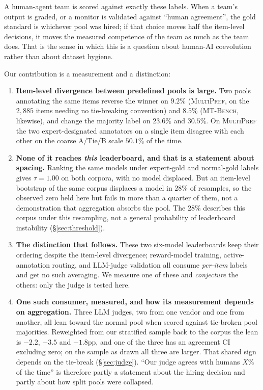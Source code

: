 \documentclass{article}
\begin{document}
A human-agent team is scored against exactly these labels. When a team's output is
graded, or a monitor is validated against ``human agreement'', the gold standard is
whichever pool was hired; if that choice moves half the item-level decisions, it
moves the measured competence of the team as much as the team does. That is the
sense in which this is a question about human-AI coevolution rather than about
dataset hygiene.

Our contribution is a measurement and a distinction:

\begin{enumerate}\itemsep2pt
\item \textbf{Item-level divergence between predefined pools is large.} Two pools
annotating the same items reverse the winner on $9.2\%$ (\textsc{MultiPref}, on the
$2{,}885$ items needing no tie-breaking convention) and $8.5\%$ (\textsc{MT-Bench},
likewise), and change the majority label on $23.6\%$ and $30.5\%$. On \textsc{MultiPref}
the two expert-designated annotators on a single item disagree with each other on the coarse
A/Tie/B scale $50.1\%$ of the time.
\item \textbf{None of it reaches \emph{this} leaderboard, and that is a statement about
spacing.} Ranking the same models under expert-gold and normal-gold labels gives
$\tau = 1.00$ on both corpora, with no model displaced. But an item-level bootstrap of the
same corpus displaces a model in $28\%$ of resamples, so the observed zero held here but
fails in more than a quarter of them, not a demonstration that aggregation absorbs the pool.
The $28\%$ describes this corpus under this resampling, not a general probability of
leaderboard instability (\S\ref{sec:threshold}).
\item \textbf{The distinction that follows.} These two six-model leaderboards keep their
ordering despite the item-level divergence; reward-model training, active-annotation
routing, and LLM-judge validation all consume \emph{per-item} labels and get no such
averaging. We measure one of these and \emph{conjecture} the others: only the judge is
tested here.
\item \textbf{One such consumer, measured, and how its measurement depends on aggregation.}
Three LLM judges, two from one vendor and one from another, all lean toward the normal
pool when scored against tie-broken pool majorities. Reweighted from our stratified sample
back to the corpus the lean is $-2.2$, $-3.5$ and $-1.8$pp, and one of the three has an
agreement CI excluding zero; on the sample as drawn all three are larger. That shared sign
depends on the tie-break (\S\ref{sec:judge}). ``Our judge agrees with humans $X\%$ of the time'' is therefore partly a
statement about the hiring decision and partly about how split pools were collapsed.
\end{enumerate}
\end{document}
